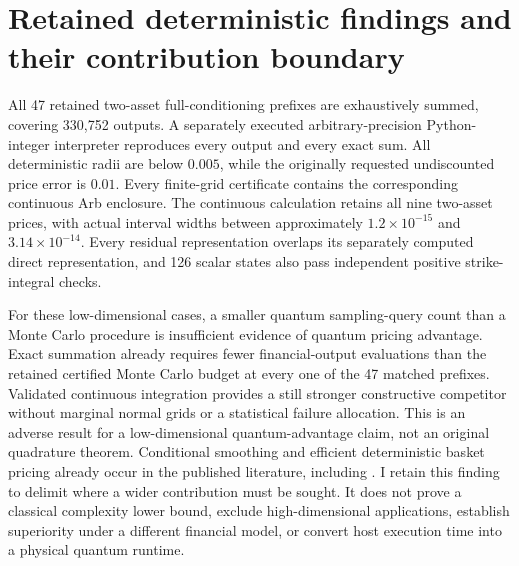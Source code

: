 \section{Retained deterministic findings and their contribution boundary}

All 47 retained two-asset full-conditioning prefixes are exhaustively summed,
covering 330,752 outputs. A separately executed arbitrary-precision
Python-integer interpreter reproduces every output and every exact sum.
All deterministic radii are below \(0.005\), while the originally requested
undiscounted price error is \(0.01\). Every finite-grid certificate contains
the corresponding continuous Arb enclosure. The continuous calculation retains
all nine two-asset prices, with actual interval widths between approximately
\(1.2\times10^{-15}\) and \(3.14\times10^{-14}\). Every residual representation
overlaps its separately computed direct representation, and 126 scalar states
also pass independent positive strike-integral checks.

For these low-dimensional cases, a smaller quantum sampling-query count than a
Monte Carlo procedure is insufficient evidence of quantum pricing advantage.
Exact summation already requires fewer financial-output evaluations than the
retained certified Monte Carlo budget at every one of the 47 matched prefixes.
Validated continuous integration provides a still stronger constructive
competitor without marginal normal grids or a statistical failure allocation.
This is an adverse result for a low-dimensional quantum-advantage claim, not an
original quadrature theorem. Conditional smoothing and efficient deterministic
basket pricing already occur in the published literature, including
\citet{bayer}. I retain this finding to delimit where a wider contribution must
be sought. It does not prove a classical complexity lower bound, exclude
high-dimensional applications, establish superiority under a different financial
model, or convert host execution time into a physical quantum runtime.
